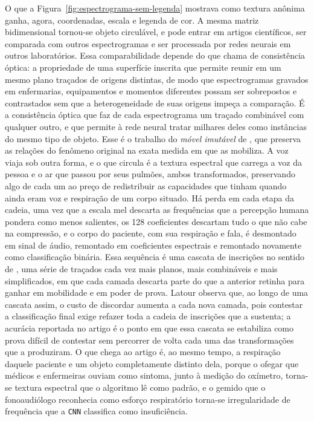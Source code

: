 O que a Figura~\ref{fig:espectrograma-sem-legenda} mostrava como textura anônima ganha, agora, coordenadas, escala e legenda de cor. A mesma matriz bidimensional tornou-se objeto circulável, e pode entrar em artigos científicos, ser comparada com outros espectrogramas e ser processada por redes neurais em outros laboratórios. Essa comparabilidade depende do que \textcite{Latour1986Visualization} chama de consistência óptica: a propriedade de uma superfície inscrita que permite reunir em um mesmo plano traçados de origens distintas, de modo que espectrogramas gravados em enfermarias, equipamentos e momentos diferentes possam ser sobrepostos e contrastados sem que a heterogeneidade de suas origens impeça a comparação. É a consistência óptica que faz de cada espectrograma um traçado combinável com qualquer outro, e que permite à rede neural tratar milhares deles como instâncias do mesmo tipo de objeto. Esse é o trabalho do \textit{móvel imutável} de \textcite{Latour1986Visualization}, que preserva as relações do fenômeno original na exata medida em que as mobiliza. A voz viaja sob outra forma, e o que circula é a textura espectral que carrega a voz da pessoa e o ar que passou por seus pulmões, ambos transformados, preservando algo de cada um ao preço de redistribuir as capacidades que tinham quando ainda eram voz e respiração de um corpo situado. Há perda em cada etapa da cadeia, uma vez que a escala mel descarta as frequências que a percepção humana pondera como menos salientes, os 128 coeficientes descartam tudo o que não cabe na compressão, e o corpo do paciente, com sua respiração e fala, é desmontado em sinal de áudio, remontado em coeficientes espectrais e remontado novamente como classificação binária. Essa sequência é uma cascata de inscrições no sentido de \textcite{Latour1986Visualization}, uma série de traçados cada vez mais planos, mais combináveis e mais simplificados, em que cada camada descarta parte do que a anterior retinha para ganhar em mobilidade e em poder de prova. Latour observa que, ao longo de uma cascata assim, o custo de discordar aumenta a cada nova camada, pois contestar a classificação final exige refazer toda a cadeia de inscrições que a sustenta; a acurácia reportada no artigo é o ponto em que essa cascata se estabiliza como prova difícil de contestar sem percorrer de volta cada uma das transformações que a produziram. O que chega ao artigo é, ao mesmo tempo, a respiração daquele paciente e um objeto completamente distinto dela, porque o ofegar que médicos e enfermeiras ouviam como sintoma, junto à medição do oxímetro, torna-se textura espectral que o algoritmo lê como padrão, e o gemido que o fonoaudiólogo reconhecia como esforço respiratório torna-se irregularidade de frequência que a \texttt{CNN} classifica como insuficiência.

